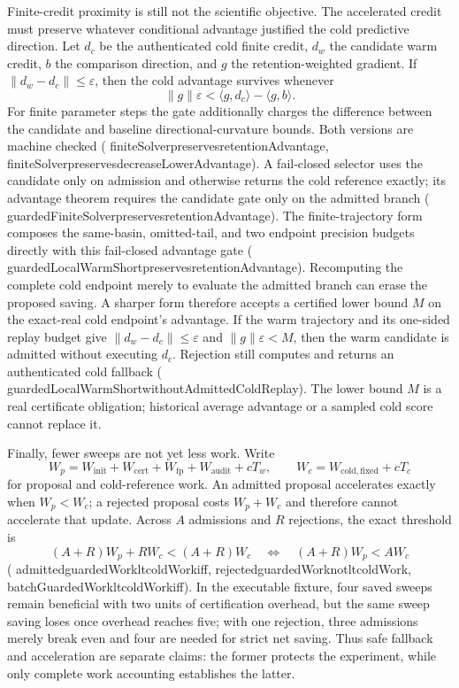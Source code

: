 \documentclass[11pt]{article}
\newcommand{\leanname}[1]{{\scriptsize\ttfamily
  \def\_{\textunderscore\allowbreak}#1}}
\begin{document}
Finite-credit proximity is still not the scientific objective. The accelerated credit
must preserve whatever conditional advantage justified the cold predictive direction.
Let $d_c$ be the authenticated cold finite credit, $d_w$ the candidate warm credit,
$b$ the comparison direction, and $g$ the retention-weighted gradient. If
$\|d_w-d_c\|\leq\varepsilon$, then the cold advantage survives whenever
\[
 \|g\|\varepsilon
 < \langle g,d_c\rangle-\langle g,b\rangle.
\]
For finite parameter steps the gate additionally charges the difference between the
candidate and baseline directional-curvature bounds. Both versions are machine checked
(\leanname{finiteSolver\_preserves\_retentionAdvantage},
\leanname{finiteSolver\_preserves\_decreaseLowerAdvantage}). A fail-closed selector uses
the candidate only on admission and otherwise returns the cold reference exactly; its
advantage theorem requires the candidate gate only on the admitted branch
(\leanname{guardedFiniteSolver\_preserves\_retentionAdvantage}).
The finite-trajectory form composes the same-basin, omitted-tail, and two endpoint
precision budgets directly with this fail-closed advantage gate
(\leanname{guardedLocalWarmShort\_preserves\_retentionAdvantage}).
Recomputing the complete cold endpoint merely to evaluate the admitted branch can erase
the proposed saving. A sharper form therefore accepts a certified lower bound $M$ on the
exact-real cold endpoint's advantage. If the warm trajectory and its one-sided replay
budget give $\|d_w-d_c\|\leq\varepsilon$ and $\|g\|\varepsilon<M$, then the warm
candidate is admitted without executing $d_c$. Rejection still computes and returns an
authenticated cold fallback
(\leanname{guardedLocalWarmShort\_withoutAdmittedColdReplay}). The lower bound $M$ is a
real certificate obligation; historical average advantage or a sampled cold score cannot
replace it.

Finally, fewer sweeps are not yet less work. Write
\[
 W_p=W_{\mathrm{init}}+W_{\mathrm{cert}}+W_{\mathrm{fp}}+W_{\mathrm{audit}}
       +cT_w,
 \qquad
 W_c=W_{\mathrm{cold,fixed}}+cT_c
\]
for proposal and cold-reference work. An admitted proposal accelerates exactly when
$W_p<W_c$; a rejected proposal costs $W_p+W_c$ and therefore cannot accelerate that
update. Across $A$ admissions and $R$ rejections, the exact threshold is
\[
 (A+R)W_p+RW_c < (A+R)W_c
 \quad\Longleftrightarrow\quad
 (A+R)W_p < AW_c
\]
(\leanname{admitted\_guardedWork\_lt\_coldWork\_iff},
\leanname{rejected\_guardedWork\_not\_lt\_coldWork},
\leanname{batchGuardedWork\_lt\_coldWork\_iff}). In the executable fixture, four saved
sweeps remain beneficial with two units of certification overhead, but the same sweep
saving loses once overhead reaches five; with one rejection, three admissions merely
break even and four are needed for strict net saving. Thus safe fallback and acceleration
are separate claims: the former protects the experiment, while only complete work
accounting establishes the latter.
\end{document}
